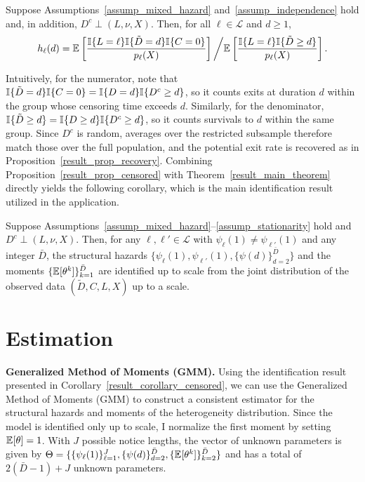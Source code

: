 \documentclass{div}
\begin{document}
\begin{prop}\label{result_prop_censored}
Suppose Assumptions~\ref{assump_mixed_hazard} and~\ref{assump_independence} hold and, in addition, $D^c \perp (L, \nu, X)$. Then, for all $\ell \in \mathcal{L}$ and $d \geq 1$,
\begin{equation*}
h_\ell(d) =
\E\left[\frac{\I\{L=\ell\}\I\{\tilde{D}=d\}\I\{C=0\}}{p_\ell(X)}\right] \bigg/
\E\left[\frac{\I\{L=\ell\}\I\{\tilde{D} \geq d\}}{p_\ell(X)}\right].
\end{equation*}
\end{prop}

Intuitively, for the numerator, note that $\I\{\tilde{D}=d\}\I\{C=0\} = \I\{D=d\}\I\{D^c \geq d\}$, so it counts exits at duration $d$ within the group whose censoring time exceeds $d$. Similarly, for the denominator, $\I\{\tilde{D} \geq d\} = \I\{D \geq d\}\I\{D^c \geq d\}$, so it counts survivals to $d$ within the same group. Since $D^c$ is random, averages over the restricted subsample therefore match those over the full population, and the potential exit rate is recovered as in Proposition~\ref{result_prop_recovery}. Combining Proposition~\ref{result_prop_censored} with Theorem~\ref{result_main_theorem} directly yields the following corollary, which is the main identification result utilized in the application. 

\begin{corr}\label{result_corollary_censored}
Suppose Assumptions~\ref{assump_mixed_hazard}--\ref{assump_stationarity} hold and $D^c \perp (L, \nu, X)$. Then, for any $\ell, \ell' \in \mathcal{L}$ with $\psi_{\ell}(1) \neq \psi_{\ell'}(1)$ and any integer $\bar{D}$, the structural hazards $\{\psi_{\ell}(1), \psi_{\ell'}(1), \{\psi(d)\}_{d=2}^{\bar{D}}\}$ and the moments $\{\E[\theta^k]\}_{k=1}^{\bar{D}}$ are identified up to scale from the joint distribution of the observed data $(\tilde{D}, C, L, X)$ up to a scale.
\end{corr}



\section{Estimation}\label{sec_estimation}

\textbf{Generalized Method of Moments (GMM).}
Using the identification result presented in Corollary~\ref{result_corollary_censored}, we can use the Generalized Method of Moments (GMM) to construct a consistent estimator for the structural hazards and moments of the heterogeneity distribution. Since the model is identified only up to scale, I normalize the first moment by setting $\E[\theta]=1$. With $J$ possible notice lengths, the vector of unknown parameters is given by $\Theta = \{\{\psi_{\ell}(1)\}_{\ell=1}^J,\{\psi(d)\}_{d=2}^{\bar{D}},\{\E[\theta^k]\}_{k=2}^{\bar{D}}\} $ and has a total of $2(\bar{D}-1)+J$ unknown parameters.
\end{document}
